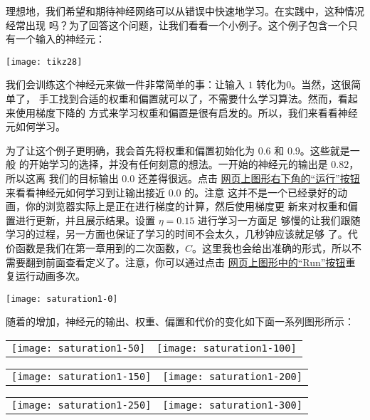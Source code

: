 理想地，我们希望和期待神经网络可以从错误中快速地学习。在实践中，这种情况经常出现
吗？为了回答这个问题，让我们看看一个小例子。这个例子包含一个只有一个输入的神经元：

\begin{center}
  \texttt{[image: tikz28]}
\end{center}

我们会训练这个神经元来做一件非常简单的事：让输入 $1$ 转化为$0$。当然，这很简单了，
手工找到合适的权重和偏置就可以了，不需要什么学习算法。然而，看起来使用梯度下降的
方式来学习权重和偏置是很有启发的。所以，我们来看看神经元如何学习。

为了让这个例子更明确，我会首先将权重和偏置初始化为 $0.6$ 和 $0.9$。这些就是一般
的开始学习的选择，并没有任何刻意的想法。一开始的神经元的输出是 $0.82$，所以这离
我们的目标输出 $0.0$ 还差得很远。点击%
\href{http://neuralnetworksanddeeplearning.com/chap3.html#the_cross-entropy_cost_function}{
  网页上图形右下角的“运行”按钮}来看看神经元如何学习到让输出接近 $0.0$ 的。注意
这并不是一个已经录好的动画，你的浏览器实际上是正在进行梯度的计算，然后使用梯度更
新来对权重和偏置进行更新，并且展示结果。设置\learningrate{} $\eta=0.15$ 进行学习一方面足
够慢的让我们跟随学习的过程，另一方面也保证了学习的时间不会太久，几秒钟应该就足够
了。代价函数是我们在第一章用到的二次函数，$C$。这里我也会给出准确的形式，所以不
需要翻到前面查看定义了。注意，你可以通过点击%
\href{http://neuralnetworksanddeeplearning.com/chap3.html#the_cross-entropy_cost_function}{
  网页上图形中的“Run”按钮}重复运行动画多次。
\begin{center}
  \texttt{[image: saturation1-0]}
\end{center}
随着\epochs{}的增加，神经元的输出、权重、偏置和代价的变化如下面一系列图形所示：
\begin{center}
  \begin{tabular}{ll}
    \texttt{[image: saturation1-50]} & \texttt{[image: saturation1-100]}\\
  \end{tabular}
  \begin{tabular}{ll}
    \texttt{[image: saturation1-150]} & \texttt{[image: saturation1-200]}\\
  \end{tabular}
  \begin{tabular}{ll}
    \texttt{[image: saturation1-250]} & \texttt{[image: saturation1-300]}
  \end{tabular}
\end{center}

